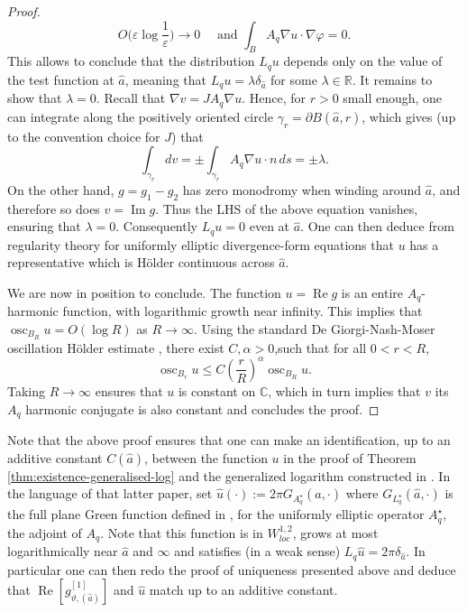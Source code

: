 \documentclass[reqno]{amsart}
\numberwithin{equation}{section}
\theoremstyle{definition}
\theoremstyle{remark}
\renewcommand\Re{\operatorname{Re}}
\renewcommand\Im{\operatorname{Im}}
\begin{document}
\begin{proof}
\[    O\Big(
    \varepsilon\log\frac1\varepsilon \Big)
    \to  0 \quad \textrm{ and } \int_B A_q \nabla u\cdot\nabla\varphi=0.
\]
This allows to conclude that the distribution $L_q u$ depends only on the value of the test function at $\hat{a}$, meaning that $L_q u=\lambda\delta_{\hat{a}}$ for some $\lambda\in\mathbb R$. It remains to show that $\lambda=0$. Recall that
$\nabla v=J A_q\nabla u$. Hence, for $r>0$ small enough, one can integrate along the positively oriented circle
$\gamma_r=\partial B(\hat a,r)$, which gives (up to the convention choice for $J$) that
\[
 \int_{\gamma_r} dv
 =
 \pm\int_{\gamma_r} A_q\nabla u\cdot n\,ds
 =
 \pm\lambda .
\]
On the other hand, $g=g_1-g_2$ has zero monodromy when winding around $\hat a$, and therefore so does $v=\Im g$. Thus the LHS of the above equation vanishes, ensuring that $\lambda=0$. 
Consequently $L_q u=0$ even at $\hat a$. One can then deduce from regularity theory for uniformly elliptic divergence-form equations \cite[Theorem 8.22]{GiTr15} that $u$ has a representative which is Hölder continuous across $\hat{a}$.

We are now in position to conclude. The function $u=\operatorname{Re}g$ is an entire
$A_q$-harmonic function, with logarithmic growth near infinity. This implies that $ \operatorname{osc}_{B_R} u = O(\log R)$ as $
  R\to\infty$. Using the standard De Giorgi-Nash-Moser oscillation Hölder estimate \cite{GiTr15}, there exist
\(C,\alpha>0\),such that for
all \(0<r<R\),
\[
    \operatorname{osc}_{B_r} u
    \le
    C\left(\frac rR\right)^\alpha
    \operatorname{osc}_{B_R} u .
\]
Taking \(R\to\infty\) ensures that \(u\) is constant on \(\mathbb C\), which in turn implies that $v$ its $A_q$ harmonic conjugate is also constant and concludes the proof.
\end{proof}
	
Note that the above proof ensures that one can make an identification, up to an additive constant $C(\hat{a})$, between the function $u$ in the proof of Theorem \ref{thm:existence-generalised-log} and the generalized logarithm constructed in \cite[Section 6]{TaylorKimBrown}. In the language of that latter paper, set $\hat{u}(\cdot) := 2\pi G_{A_q^\star}(\hat{a},\cdot)$ where $G_{L_q^\star}(\hat{a},\cdot)$ is the full plane Green function defined in \cite[Theorem 6.7]{TaylorKimBrown}, for the uniformly elliptic operator $A_q^\star$, the adjoint of $A_q$. Note that this function is in $W^{1,2}_{loc} $, grows at most logarithmically near $\hat{a}$ and $\infty$ and satisfies (in a weak sense) $L_q \hat{u}=2\pi \delta_{\hat{a}}$. In particular one can then redo the proof of uniqueness presented above and deduce that $\Re[g^{[1]}_{\vartheta,(\hat{a})}]$ and $\hat{u} $ match up to an additive constant.
\end{document}

